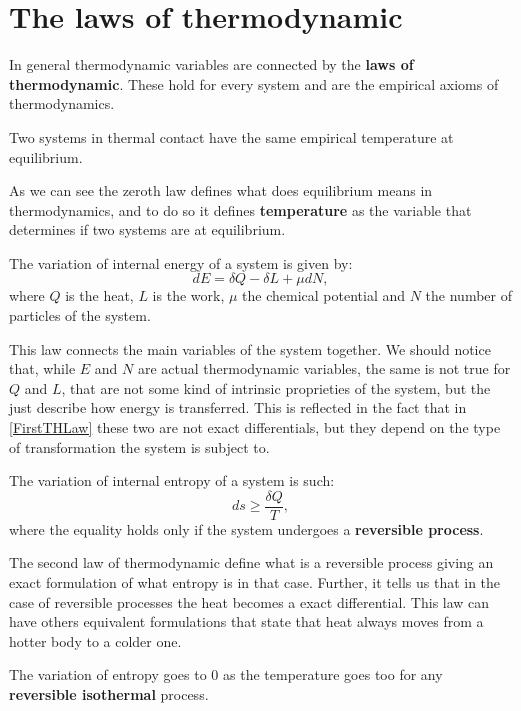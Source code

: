 \section{The laws of thermodynamic}
In general thermodynamic variables are connected by the \textbf{laws of thermodynamic}. These hold for every system and are the empirical axioms of thermodynamics.\\
\begin{law}[Zeroth]
  Two systems in thermal contact have the same empirical temperature at equilibrium.
\end{law}
As we can see the zeroth law defines what does equilibrium means in thermodynamics, and to do so it defines \textbf{temperature} as the variable that determines if two systems are at equilibrium.
\begin{law}[First]
    The variation of internal energy of a system is given by:
    \begin{equation}
        \label{FirstTHLaw} dE=\delta Q-\delta L+\mu dN,
    \end{equation}
    where $Q$ is the heat, $L$ is the work, $\mu$ the chemical potential and $N$ the number of particles of the system. 
\end{law}
This law connects the main variables of the system together. We should notice that, while $E$ and $N$ are actual thermodynamic variables, the same is not true for $Q$ and $L$, that are not some kind of intrinsic proprieties of the system, but the just describe how energy is transferred. This is reflected in the fact that in \eqref{FirstTHLaw} these two are not exact differentials, but they depend on the type of transformation the system is subject to.
\begin{law}[Second]
    The variation of internal entropy of a system is such:
    \begin{equation}
        \label{SecondTHLaw} ds\geq\frac{\delta Q}{T},
    \end{equation}
    where the equality holds only if the system undergoes a \textbf{reversible process}. 
\end{law}
The second law of thermodynamic define what is a reversible process giving an exact formulation of what entropy is in that case. Further, it tells us that in the case of reversible processes the heat becomes a exact differential. This law can have others equivalent formulations that state that heat always moves from a hotter body to a colder one.
\begin{law}[Third]
    The variation of entropy goes to 0 as the temperature goes too for any \textbf{reversible isothermal} process. 
\end{law}
